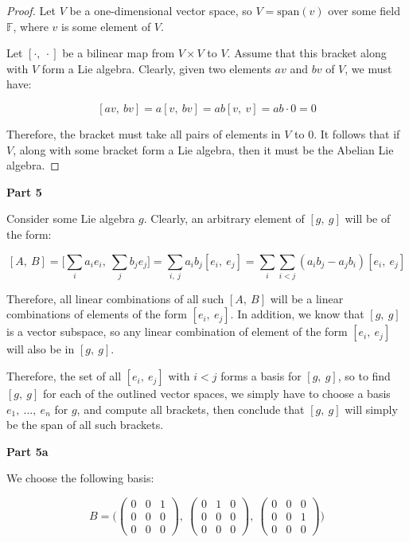 \documentclass[10pt, oneside]{article}
\begin{document}
    \begin{proof}
      Let $V$ be a one-dimensional vector space, so $V = \text{span}(v)$ over some field $\mathbb{F}$, where $v$ is some element of $V$.
      \newline

      Let $[\cdot, \ \cdot]$ be a bilinear map from $V \times V$ to $V$. Assume that this bracket along with $V$ form a Lie algebra. Clearly,
      given two elements $av$ and $bv$ of $V$, we must have:

      $$[av, \ bv] = a[v, \ bv] = ab[v, \ v] = ab \cdot 0 = 0$$

      Therefore, the bracket must take all pairs of elements in $V$ to $0$. It follows that if $V$, along with some bracket form a Lie algebra, then
      it must be the Abelian Lie algebra.
    \end{proof}

    \textbf{Part 5}
    \newline

    Consider some Lie algebra $g$. Clearly, an arbitrary element of $[g, \ g]$ will be of the form:

    $$[A, \ B] = \Big[ \displaystyle\sum_{i} a_i e_i, \ \displaystyle\sum_{j} b_{j} e_{j} \Big] = \displaystyle\sum_{i, \ j} a_{i} b_{j} [e_i, \ e_j] = \displaystyle\sum_{i} \displaystyle\sum_{i < j} (a_{i} b_{j} - a_{j} b_{i}) [e_i, \ e_j]$$

    Therefore, all linear combinations of all such $[A, \ B]$ will be a linear combinations of elements of the form $[e_i, \ e_j]$.
    In addition, we know that $[g, \ g]$ is a vector subspace, so any linear combination of element of the form $[e_i, \ e_j]$ will also be in $[g, \ g]$.
    \newline

    Therefore, the set of all $[e_i, \ e_j]$ with $i < j$ forms
    a basis for $[g, \ g]$, so to find $[g, \ g]$ for each of the outlined vector spaces, we simply have to choose a basis $e_1, \ ..., \ e_n$ for $g$, and compute all brackets, then conclude that
    $[g, \ g]$ will simply be the span of all such brackets.
    \newline

    \textbf{Part 5a}
    \newline

    We choose the following basis:

    $$B = \Big( \begin{pmatrix} 0 & 0 & 1 \\ 0 & 0 & 0 \\ 0 & 0 & 0 \end{pmatrix}, \ \begin{pmatrix} 0 & 1 & 0 \\ 0 & 0 & 0 \\ 0 & 0 & 0 \end{pmatrix}, \ \begin{pmatrix} 0 & 0 & 0 \\ 0 & 0 & 1 \\ 0 & 0 & 0 \end{pmatrix} \Big)$$
\end{document}

